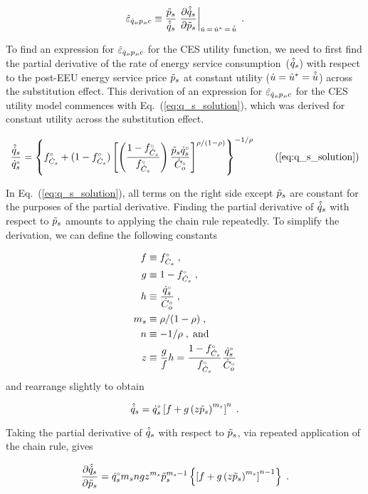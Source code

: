 \documentclass[12pt]{article}\usepackage[]{graphicx}\usepackage[]{xcolor}
\begin{document}
\begin{equation} \label{eq:eqspsC_def}
  \eqspsChat \equiv \frac{\amacro{p}_s}{\rasub{q}_s} \eval{\pdv{\rasub{q}_s}{\amacro{p}_s}}_{\rate{u} \, = \, \rbsub{u} \, = \, \rasub{u}} \; .
\end{equation}

To find an expression for $\hat{\varepsilon}_{\dot{q}_s\!,p_s\!,c}$ for the CES utility function, 
we need to first find the partial derivative of the rate of energy service consumption~($\hat{\dot{q}}_s$)
with respect to the post-EEU energy service price $\tilde{p}_s$ 
at constant utility ($\dot{u} = {\dot{u}}^* = \hat{\dot{u}}$)
across the substitution effect.
This derivation of an expression for $\hat{\varepsilon}_{\dot{q}_s\!,p_s\!,c}$ for the CES utility model
commences with Eq.~(\ref{eq:q_s_solution}),
which was derived for constant utility across the 
substitution effect. 

\begin{equation}
  \frac{\rasub{q}_s}{\rbempl{q}_s} = \qssolution{} \tag{\ref{eq:q_s_solution}}
\end{equation}

In Eq.~(\ref{eq:q_s_solution}), all terms on the right side except $\tilde{p}_s$ are constant 
for the purposes of the partial derivative. 
Finding the partial derivative 
of $\hat{\dot{q}}_s$ with respect to $\tilde{p}_s$
amounts to applying the chain rule repeatedly.
To simplify the derivation, 
we can define the following constants

\begin{align}
  f &\equiv {}{f}^{\scriptscriptstyle \circ}_{\dot{C}_s}{} \; , \\
  g &\equiv 1 - {}{f}^{\scriptscriptstyle \circ}_{\dot{C}_s}{} \; , \\
  h &\equiv \frac{{}{\dot{q}}^{\scriptscriptstyle \circ}_s}{{}{\dot{C}}^{\scriptscriptstyle \circ}_o} \; , \\
  m_s &\equiv \rho / (1 - \rho) \; , \\
  n &\equiv - 1 / \rho \; , \; \mathrm{and} \\
  z &\equiv \frac{g}{f} h = \frac{1 - {}{f}^{\scriptscriptstyle \circ}_{\dot{C}_s}}{{}{f}^{\scriptscriptstyle \circ}_{\dot{C}_s}} \frac{{}{\dot{q}}^{\scriptscriptstyle \circ}_s}{{}{\dot{C}}^{\scriptscriptstyle \circ}_o}
\end{align}
%
and rearrange slightly to obtain

\begin{equation} 
  \hat{\dot{q}}_s = {}{\dot{q}}^{\scriptscriptstyle \circ}_s \left[ f + g \left( z \tilde{p}_s \right) ^ {m_s} \right] ^ n \; .
\end{equation}

Taking the partial derivative of $\hat{\dot{q}}_s$ with respect to $\tilde{p}_s$,
via repeated application of the chain rule, gives

\begin{equation}
  \pdv{\hat{\dot{q}}_s}{\tilde{p}_s} = {}{\dot{q}}^{\scriptscriptstyle \circ}_s m_s n g z^{m_s} \tilde{p}_s^{m_s-1} 
                \left\{ \left[ f + g \left( z \tilde{p}_s \right)^{m_s} \right]^{n-1} \right\} \; .
\end{equation}
\end{document}
